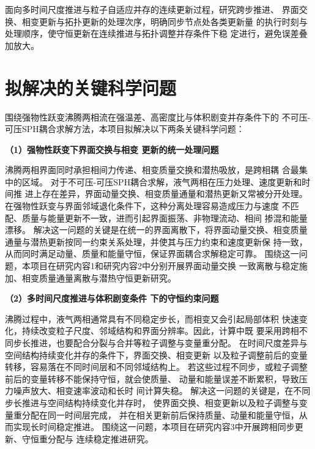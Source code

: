 面向多时间尺度推进与粒子自适应并存的连续更新过程，研究跨步推进、
界面交换、相变更新与拓扑更新的处理次序，明确同步节点处各类更新量
的执行时刻与处理顺序，使守恒更新在连续推进与拓扑调整并存条件下稳
定进行，避免误差叠加放大。

\section{拟解决的关键科学问题}
围绕强物性跃变沸腾两相流在强温差、高密度比与体积剧变并存条件下的
不可压-可压SPH耦合求解方法，本项目拟解决以下两条关键科学问题：

\textbf{（1）\textcolor{B}{\zhhei 强物性跃变下界面交换与相变
		更新的统一处理问题}}

沸腾两相界面同时承担相间力传递、相变质量交换和潜热吸放，是跨相耦
合最集中的区域。
对于不可压-可压SPH耦合求解，液气两相在压力处理、速度更新和时间推
进上存在差异，界面动量交换、相变质量通量和潜热更新又常被分开处理。
在强物性跃变与界面邻域退化条件下，这种分离处理容易造成压力与速度
不匹配、质量与能量更新不一致，进而引起界面振荡、非物理流动、相间
掺混和能量漂移。
解决这一问题的关键是在统一的界面离散下，将界面动量交换、相变质量
通量与潜热更新按同一约束关系处理，并使其与压力约束和速度更新保
持一致，从而同时满足动量、质量和能量守恒，保证界面耦合求解稳定可靠。
围绕这一问题，本项目在研究内容1和研究内容2中分别开展界面动量交换
一致离散与稳定施加、相变质量通量离散与潜热守恒更新研究。

\textbf{（2）\textcolor{B}{\zhhei 多时间尺度推进与体积剧变条件
		下的守恒约束问题}}

沸腾过程中，液气两相通常具有不同稳定步长，而相变又会引起局部体积
快速变化，持续改变粒子尺度、邻域结构和界面分辨率。因此，计算中既
要采用跨相不同步长推进，也要配合分裂与合并等粒子调整与变量重分配。
在时间尺度差异与空间结构持续变化并存的条件下，界面交换、相变更新
以及粒子调整前后的变量转移，容易落在不同时间层和不同邻域结构上。
若这些过程不同步，或粒子调整前后的变量转移不能保持守恒，就会使质量、
动量和能量误差不断累积，导致压力噪声放大、相变速率波动和长时
间计算失稳。
解决这一问题的关键是，在不同步长推进与空间结构持续变化并存时，
使界面交换、相变更新以及粒子调整与变量重分配在同一时间层完成，
并在相关更新前后保持质量、动量和能量守恒，从而实现长时间稳定推进。
围绕这一问题，本项目在研究内容3中开展跨相同步更新、守恒重分配与
连续稳定推进研究。

